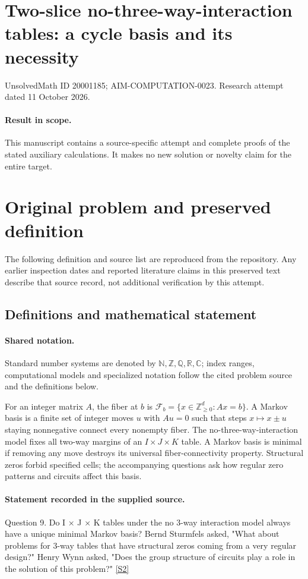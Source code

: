 \documentclass[11pt]{article}
\begin{document}
\section*{Two-slice no-three-way-interaction tables: a cycle basis and its necessity}
\noindent UnsolvedMath ID 20001185; AIM-COMPUTATION-0023. Research attempt dated 11 October 2026.
\paragraph{Result in scope.}This manuscript contains a source-specific attempt and complete proofs of the stated auxiliary calculations. It makes no new solution or novelty claim for the entire target.
\section{Original problem and preserved definition}
The following definition and source list are reproduced from the repository. Any earlier inspection dates and reported literature claims in this preserved text describe that source record, not additional verification by this attempt.
\subsection{Definitions and mathematical statement}

\paragraph{Shared notation.}Standard number systems are denoted by $\mathbb N,\mathbb Z,\mathbb Q,\mathbb R,\mathbb C$; index ranges, computational models and specialized notation follow the cited problem source and the definitions below.


For an integer matrix $A$, the fiber at $b$ is $\mathcal F_b=\{x\in\mathbb Z_{\ge0}^d:Ax=b\}$. A Markov basis is a finite set of integer moves $u$ with $Au=0$ such that steps $x\mapsto x\pm u$ staying nonnegative connect every nonempty fiber. The no-three-way-interaction model fixes all two-way margins of an $I\times J\times K$ table. A Markov basis is minimal if removing any move destroys its universal fiber-connectivity property. Structural zeros forbid specified cells; the accompanying questions ask how regular zero patterns and circuits affect this basis.
\paragraph{Statement recorded in the supplied source.}
Question 9. Do I × J × K tables under the no 3-way interaction model always have a unique minimal Markov basis? Bernd Sturmfels asked, "What about problems for 3-way tables that have structural zeros coming from a very regular design?" Henry Wynn asked, "Does the group structure of circuits play a role in the solution of this problem?" \href{https://aimath.org/WWN/compalgstat/compalgstat.pdf}{[S2]}
\end{document}
